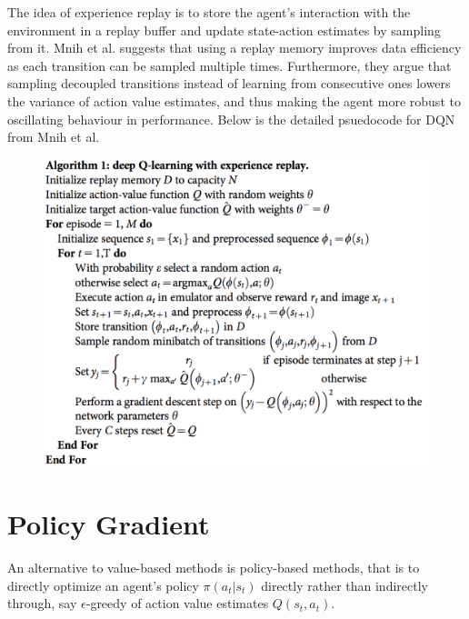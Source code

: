 \documentclass[12pt]{report}
\begin{document}
The idea of experience replay is to store the agent's interaction with the environment in a replay buffer and update state-action estimates by sampling from it. Mnih et al. \cite{mnih2013playing} suggests that using a replay memory improves data efficiency as each transition can be sampled multiple times. Furthermore, they argue that sampling decoupled transitions instead of learning from consecutive ones lowers the variance of action value estimates, and thus making the agent more robust to oscillating behaviour in performance. Below is the detailed psuedocode for DQN from Mnih et al. \cite{mnih2013playing}
\begin{figure}[H]
    \center
    \includegraphics[width=0.7\linewidth]{figs/DQN_pseudocode.png}
    \label{fig:dqn}
\end{figure}

\section{Policy Gradient} \label{sec:policy-grad}

An alternative to value-based methods is policy-based methods, that is to directly optimize an agent's policy $\pi(a_t|s_t)$ directly rather than indirectly through, say $\epsilon$-greedy of action value estimates $Q(s_t,a_t)$.\\
\end{document}
